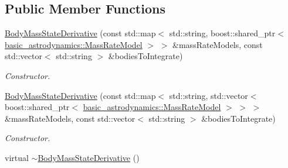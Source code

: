 \subsection*{Public Member Functions}
\begin{DoxyCompactItemize}
\item 
\hyperlink{classtudat_1_1propagators_1_1BodyMassStateDerivative_af37273f35aa12cea6df1baf0fa8b7e4c}{Body\+Mass\+State\+Derivative} (const std\+::map$<$ std\+::string, boost\+::shared\+\_\+ptr$<$ \hyperlink{classtudat_1_1basic__astrodynamics_1_1MassRateModel}{basic\+\_\+astrodynamics\+::\+Mass\+Rate\+Model} $>$ $>$ \&mass\+Rate\+Models, const std\+::vector$<$ std\+::string $>$ \&bodies\+To\+Integrate)
\begin{DoxyCompactList}\small\item\em Constructor. \end{DoxyCompactList}\item 
\hyperlink{classtudat_1_1propagators_1_1BodyMassStateDerivative_a781a7a03062385ab3fada5e17e7f26d0}{Body\+Mass\+State\+Derivative} (const std\+::map$<$ std\+::string, std\+::vector$<$ boost\+::shared\+\_\+ptr$<$ \hyperlink{classtudat_1_1basic__astrodynamics_1_1MassRateModel}{basic\+\_\+astrodynamics\+::\+Mass\+Rate\+Model} $>$ $>$ $>$ \&mass\+Rate\+Models, const std\+::vector$<$ std\+::string $>$ \&bodies\+To\+Integrate)
\begin{DoxyCompactList}\small\item\em Constructor. \end{DoxyCompactList}\item 
virtual \hyperlink{classtudat_1_1propagators_1_1BodyMassStateDerivative_a6af47edeba268e48d2d78011a9047889}{$\sim$\+Body\+Mass\+State\+Derivative} ()\hypertarget{classtudat_1_1propagators_1_1BodyMassStateDerivative_a6af47edeba268e48d2d78011a9047889}{}\label{classtudat_1_1propagators_1_1BodyMassStateDerivative_a6af47edeba268e48d2d78011a9047889}


\end{DoxyCompactItemize}
